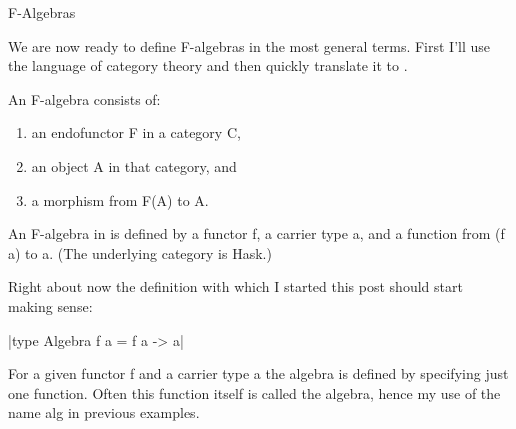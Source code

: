\documentclass[proposal.tex]{subfiles}
\begin{document}
F-Algebras


We are now ready to define F-algebras in the most general terms.
First I'll use the language of category theory and then quickly translate it to .

An F-algebra consists of:
\begin{enumerate}
\item an endofunctor F in a category C,
\item an object A in that category, and
\item a morphism from F(A) to A.
\end{enumerate}

An F-algebra in  is defined by a functor f, a carrier type a, and a function from (f a) to a. (The underlying category is Hask.)

Right about now the definition with which I started this post should start making sense:

|type Algebra f a = f a -> a|

For a given functor f and a carrier type a the algebra is defined by specifying just one function.
Often this function itself is called the algebra, hence my use of the name alg in previous examples.
\end{document}
